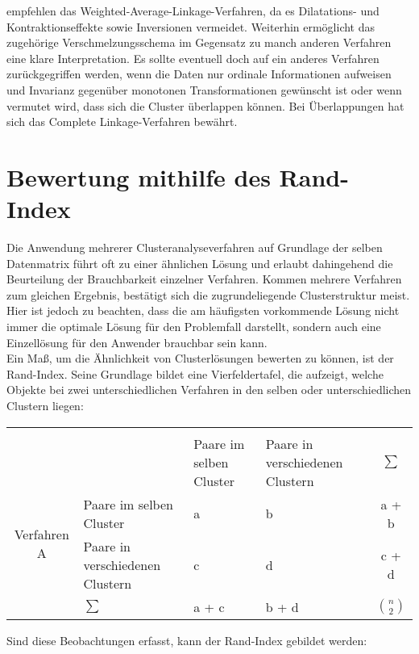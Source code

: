 \citet[S. 275]{Bacher.2010} empfehlen das Weighted-Average-Linkage-Verfahren, da es Dilatations- und Kontraktionseffekte sowie Inversionen vermeidet. Weiterhin ermöglicht das zugehörige Verschmelzungsschema im Gegensatz zu manch anderen Verfahren eine klare Interpretation. Es sollte eventuell doch auf ein anderes Verfahren zurückgegriffen werden, wenn die Daten nur ordinale Informationen aufweisen und Invarianz gegenüber monotonen Transformationen gewünscht ist oder wenn vermutet wird, dass sich die Cluster überlappen können. Bei Überlappungen hat sich das Complete Linkage-Verfahren bewährt.

\section{Bewertung mithilfe des Rand-Index}

Die Anwendung mehrerer Clusteranalyseverfahren auf Grundlage der selben Datenmatrix führt oft zu einer ähnlichen Lösung und erlaubt dahingehend die Beurteilung der Brauchbarkeit einzelner Verfahren. Kommen mehrere Verfahren zum gleichen Ergebnis, bestätigt sich die zugrundeliegende Clusterstruktur meist. Hier ist jedoch zu beachten, dass die am häufigsten vorkommende Lösung nicht immer die optimale Lösung für den Problemfall darstellt, sondern auch eine Einzellösung für den Anwender brauchbar sein kann. \\
Ein Maß, um die Ähnlichkeit von Clusterlösungen bewerten zu können, ist der Rand-Index. Seine Grundlage bildet eine Vierfeldertafel, die aufzeigt, welche Objekte bei zwei unterschiedlichen Verfahren in den selben oder unterschiedlichen Clustern liegen:

\begin{tabular}{c>{\raggedright\arraybackslash}p{4cm}|>{\centering\arraybackslash}p{3.5cm}>{\centering\arraybackslash}p{3.5cm}|c}
	& & \multicolumn{2}{c|}{Verfahren B} & \\ 
	& & Paare im selben Cluster & Paare in verschiedenen Clustern & $\sum$ \\ \hline
	\multirow{2}{*}{Verfahren A} & Paare im selben Cluster & a & b & a + b \\
	& Paare in verschiedenen Clustern & c & d & c + d \\ \hline
	& $\sum$ & a + c & b + d & $\binom{n}{2}$ \\ 
\end{tabular}
\bigskip

Sind diese Beobachtungen erfasst, kann der Rand-Index gebildet werden:

